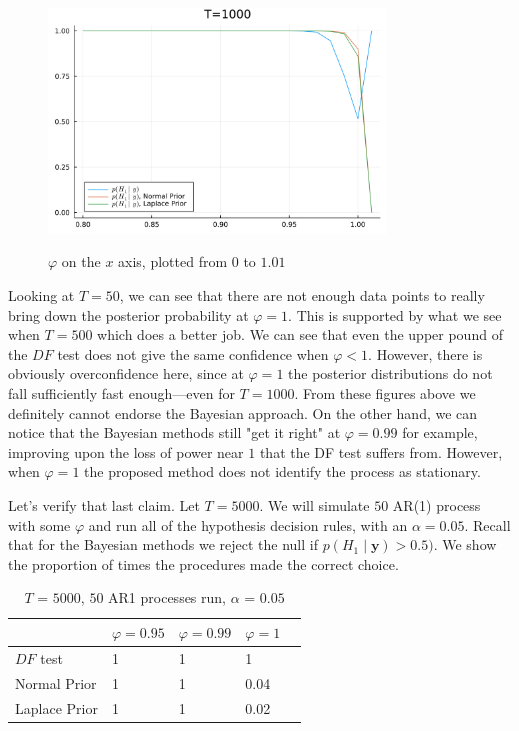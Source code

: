\documentclass{article}
\theoremstyle{definition}
\theoremstyle{exercise}
\theoremstyle{remark}
\begin{document}
\begin{figure}[htpb]
    \centering
    {\includegraphics[width=0.8\textwidth]{./plots/posterior_probs_1000.png}}
    \caption{$\varphi$ on the $x$ axis, plotted from $0$ to $1.01$}
    \label{fig:pp2}
\end{figure}

Looking at $T=50$, we can see that there are not enough data points to really bring down the posterior probability at $\varphi = 1$. This is supported by what we see when $T=500$ which does a better job.
We can see that even the upper pound of the $DF$ test does not give the same confidence when $\varphi < 1$. However, there is obviously overconfidence here, since at $\varphi = 1$ the posterior distributions do not fall sufficiently fast enough---even for $T=1000$. From these figures above we definitely cannot endorse the Bayesian approach.
On the other hand, we can notice that the Bayesian methods still "get it right" at $\varphi = 0.99$ for example, improving upon the loss of power near $1$ that the DF test suffers from.
However, when $\varphi = 1$ the proposed method does not identify the process as stationary.


Let's verify that last claim. Let $T = 5000$.
We will simulate $50$ AR(1) process with some $\varphi$ and run all of the hypothesis decision rules, with an $\alpha = 0.05$. Recall that for the Bayesian methods we reject the null if $p(H_1 \;|\; \mathbf{y}) > 0.5)$.
We show the proportion of times the procedures made the correct choice.

\begin{table}[H]
\centering
\begin{tabular}{lllll}
    \toprule
 & $\varphi=0.95$ & $\varphi=0.99$ & $\varphi=1$ &  \\ \midrule
$DF$ test      & 1 & 1 &  1 &  \\
 Normal Prior  & 1 & 1 &  0.04 &  \\
Laplace Prior  & 1 & 1 &  0.02 & 
\end{tabular}
    \caption{$T$ = $5000$, $50$ AR1 processes run, $\alpha$ = $0.05$}
    \label{tab}
\end{table}
\end{document}
